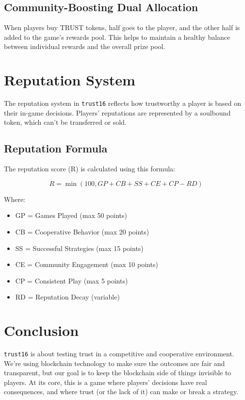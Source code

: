 \documentclass[table, twocolumn]{article}
\begin{document}
\subsection{Community-Boosting Dual Allocation}
When players buy TRUST tokens, half goes to the player, and the other half is added to the game’s rewards pool. This helps to maintain a healthy balance between individual rewards and the overall prize pool.

\section{Reputation System}

The reputation system in \texttt{trust16} reflects how trustworthy a player is based on their in-game decisions. Players’ reputations are represented by a soulbound token, which can’t be transferred or sold.

\subsection{Reputation Formula}
The reputation score (R) is calculated using this formula:

\begin{equation}
R = \min(100, GP + CB + SS + CE + CP - RD)
\end{equation}

Where:
\begin{itemize}
    \item GP = Games Played (max 50 points)
    \item CB = Cooperative Behavior (max 20 points)
    \item SS = Successful Strategies (max 15 points)
    \item CE = Community Engagement (max 10 points)
    \item CP = Consistent Play (max 5 points)
    \item RD = Reputation Decay (variable)
\end{itemize}

\section{Conclusion}

\texttt{trust16} is about testing trust in a competitive and cooperative environment. We’re using blockchain technology to make sure the outcomes are fair and transparent, but our goal is to keep the blockchain side of things invisible to players. At its core, this is a game where players’ decisions have real consequences, and where trust (or the lack of it) can make or break a strategy.
\end{document}
